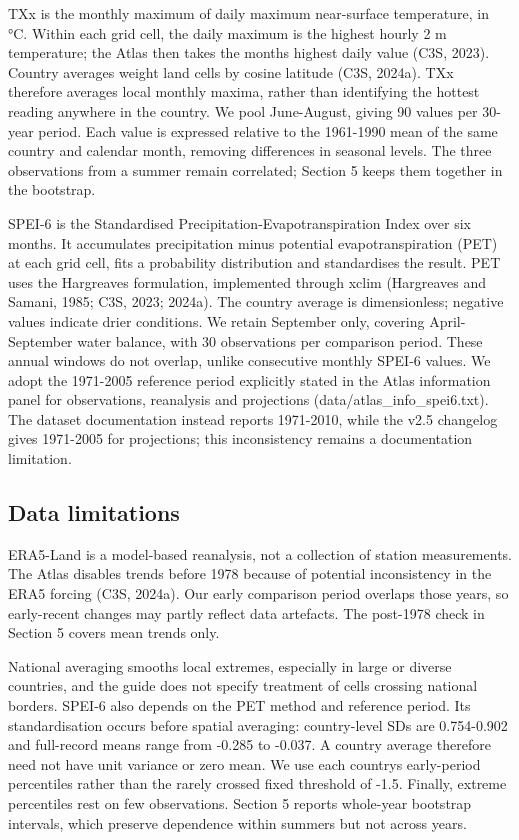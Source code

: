 \documentclass[
  10pt,
]{article}
\begin{document}
TXx is the monthly maximum of daily maximum near-surface temperature, in
°C. Within each grid cell, the daily maximum is the highest hourly 2 m
temperature; the Atlas then takes the month\textquotesingle s highest
daily value (C3S, 2023). Country averages weight land cells by cosine
latitude (C3S, 2024a). TXx therefore averages local monthly maxima,
rather than identifying the hottest reading anywhere in the country. We
pool June-August, giving 90 values per 30-year period. Each value is
expressed relative to the 1961-1990 mean of the same country and
calendar month, removing differences in seasonal levels. The three
observations from a summer remain correlated; Section 5 keeps them
together in the bootstrap.

SPEI-6 is the Standardised Precipitation-Evapotranspiration Index over
six months. It accumulates precipitation minus potential
evapotranspiration (PET) at each grid cell, fits a probability
distribution and standardises the result. PET uses the Hargreaves
formulation, implemented through xclim (Hargreaves and Samani, 1985;
C3S, 2023; 2024a). The country average is dimensionless; negative values
indicate drier conditions. We retain September only, covering
April-September water balance, with 30 observations per comparison
period. These annual windows do not overlap, unlike consecutive monthly
SPEI-6 values. We adopt the 1971-2005 reference period explicitly stated
in the Atlas information panel for observations, reanalysis and
projections (data/atlas\_info\_spei6.txt). The dataset documentation
instead reports 1971-2010, while the v2.5 changelog gives 1971-2005 for
projections; this inconsistency remains a documentation limitation.

\subsection{Data limitations}\label{data-limitations}

ERA5-Land is a model-based reanalysis, not a collection of station
measurements. The Atlas disables
trends before 1978 because of potential inconsistency in the ERA5
forcing (C3S, 2024a). Our early comparison period overlaps those years,
so early-recent changes may partly reflect data artefacts. The post-1978
check in Section 5 covers mean trends only.

National averaging smooths local extremes, especially in large or
diverse countries, and the guide does not specify treatment of cells
crossing national borders. SPEI-6 also depends on the PET method and
reference period. Its standardisation occurs before spatial averaging:
country-level SDs are 0.754-0.902 and full-record means range from
-0.285 to -0.037. A country average therefore need not have unit
variance or zero mean. We use each country\textquotesingle s
early-period percentiles rather than the rarely crossed fixed threshold
of -1.5. Finally, extreme percentiles rest on few observations. Section
5 reports whole-year bootstrap intervals, which preserve dependence
within summers but not across years.
\end{document}
